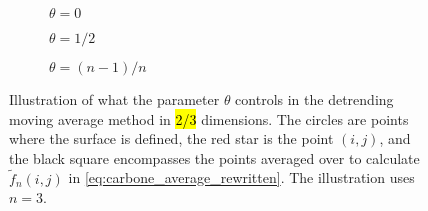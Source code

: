
\begin{figure}[htpb]%
    \centering%
    \begin{subfigure}[b]{0.25\textwidth}%
        \caption{$\theta = 0$}%
        \label{fig:DMA_theta_a}%
    \end{subfigure}%
    \hspace{0.1\textwidth}%
    \begin{subfigure}[b]{0.25\textwidth}%
        \caption{$\theta = 1/2$}%
        \label{fig:DMA_theta_b}%
    \end{subfigure}%
    \hspace{0.1\textwidth}%
    \begin{subfigure}[b]{0.25\textwidth}%
        \caption{$\theta = (n-1)/n$}%
        \label{fig:DMA_theta_c}%
    \end{subfigure}%
        \caption{%
        Illustration of what the parameter $\theta$ controls in the detrending moving average method in \hl{2/3} dimensions. The circles are points where the surface is defined, the red star is the point $(i,j)$, and the black square encompasses the points averaged over to calculate $\tilde f_n(i,j)$ in \cref{eq:carbone_average_rewritten}. The illustration uses $n = 3$.%
        \label{fig:DMA_theta}%
    }%
\end{figure}%

